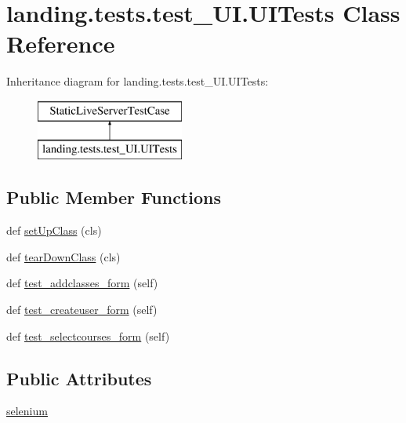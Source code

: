 \hypertarget{classlanding_1_1tests_1_1test__UI_1_1UITests}{}\section{landing.\+tests.\+test\+\_\+\+U\+I.\+U\+I\+Tests Class Reference}
\label{classlanding_1_1tests_1_1test__UI_1_1UITests}
Inheritance diagram for landing.\+tests.\+test\+\_\+\+U\+I.\+U\+I\+Tests\+:\begin{figure}[H]
\begin{center}
\leavevmode
\includegraphics[height=2.000000cm]{classlanding_1_1tests_1_1test__UI_1_1UITests}
\end{center}
\end{figure}
\subsection*{Public Member Functions}
\begin{DoxyCompactItemize}
\item 
def \mbox{\hyperlink{classlanding_1_1tests_1_1test__UI_1_1UITests_a63dc03589cdac58df8716fbb1fb3279b}{set\+Up\+Class}} (cls)
\item 
def \mbox{\hyperlink{classlanding_1_1tests_1_1test__UI_1_1UITests_a2d3a96bc34095bed7567d567563e8d82}{tear\+Down\+Class}} (cls)
\item 
def \mbox{\hyperlink{classlanding_1_1tests_1_1test__UI_1_1UITests_ac3d481487cc39ef72303722c3fd779d7}{test\+\_\+addclasses\+\_\+form}} (self)
\item 
def \mbox{\hyperlink{classlanding_1_1tests_1_1test__UI_1_1UITests_a97adaea38b64567b0757f65c31770044}{test\+\_\+createuser\+\_\+form}} (self)
\item 
def \mbox{\hyperlink{classlanding_1_1tests_1_1test__UI_1_1UITests_a2d1e2011a8c152e486dc0c415797fdc9}{test\+\_\+selectcourses\+\_\+form}} (self)
\end{DoxyCompactItemize}
\subsection*{Public Attributes}
\begin{DoxyCompactItemize}
\item 
\mbox{\hyperlink{classlanding_1_1tests_1_1test__UI_1_1UITests_a71f844dbde9cf4cf3b0a74dcbe13bdd9}{selenium}}
\end{DoxyCompactItemize}


